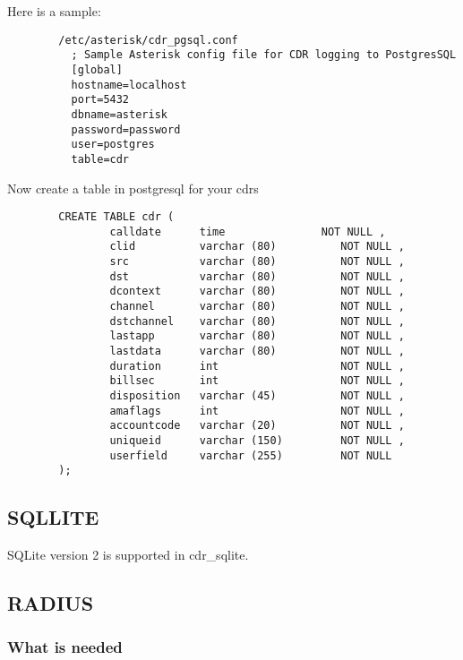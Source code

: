         Here is a sample:
\begin{astlisting}
\begin{verbatim}
        /etc/asterisk/cdr_pgsql.conf
          ; Sample Asterisk config file for CDR logging to PostgresSQL
          [global]
          hostname=localhost
          port=5432
          dbname=asterisk
          password=password
          user=postgres
          table=cdr
\end{verbatim}
\end{astlisting}
        Now create a table in postgresql for your cdrs
\begin{astlisting}
\begin{verbatim}
        CREATE TABLE cdr (
                calldate      time               NOT NULL ,
                clid          varchar (80)          NOT NULL ,
                src           varchar (80)          NOT NULL ,
                dst           varchar (80)          NOT NULL ,
                dcontext      varchar (80)          NOT NULL ,
                channel       varchar (80)          NOT NULL ,
                dstchannel    varchar (80)          NOT NULL ,
                lastapp       varchar (80)          NOT NULL ,
                lastdata      varchar (80)          NOT NULL ,
                duration      int                   NOT NULL ,
                billsec       int                   NOT NULL ,
                disposition   varchar (45)          NOT NULL ,
                amaflags      int                   NOT NULL ,
                accountcode   varchar (20)          NOT NULL ,
                uniqueid      varchar (150)         NOT NULL ,
                userfield     varchar (255)         NOT NULL
        );
\end{verbatim}
\end{astlisting}

\subsection{SQLLITE}

SQLite version 2 is supported in cdr\_sqlite.

\subsection{RADIUS}

\subsubsection{What is needed}

